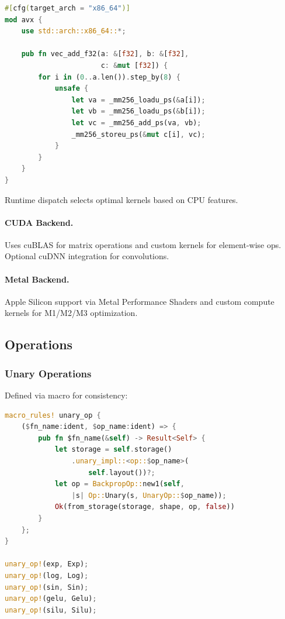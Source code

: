 \begin{lstlisting}[language=Rust]
#[cfg(target_arch = "x86_64")]
mod avx {
    use std::arch::x86_64::*;

    pub fn vec_add_f32(a: &[f32], b: &[f32],
                       c: &mut [f32]) {
        for i in (0..a.len()).step_by(8) {
            unsafe {
                let va = _mm256_loadu_ps(&a[i]);
                let vb = _mm256_loadu_ps(&b[i]);
                let vc = _mm256_add_ps(va, vb);
                _mm256_storeu_ps(&mut c[i], vc);
            }
        }
    }
}
\end{lstlisting}

Runtime dispatch selects optimal kernels based on CPU features.

\paragraph{CUDA Backend.} Uses cuBLAS for matrix operations and custom kernels for element-wise ops. Optional cuDNN integration for convolutions.

\paragraph{Metal Backend.} Apple Silicon support via Metal Performance Shaders and custom compute kernels for M1/M2/M3 optimization.

\subsection{Operations}

\subsubsection{Unary Operations}

Defined via macro for consistency:

\begin{lstlisting}[language=Rust]
macro_rules! unary_op {
    ($fn_name:ident, $op_name:ident) => {
        pub fn $fn_name(&self) -> Result<Self> {
            let storage = self.storage()
                .unary_impl::<op::$op_name>(
                    self.layout())?;
            let op = BackpropOp::new1(self,
                |s| Op::Unary(s, UnaryOp::$op_name));
            Ok(from_storage(storage, shape, op, false))
        }
    };
}

unary_op!(exp, Exp);
unary_op!(log, Log);
unary_op!(sin, Sin);
unary_op!(gelu, Gelu);
unary_op!(silu, Silu);
\end{lstlisting}

